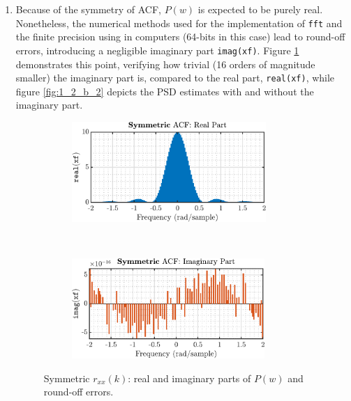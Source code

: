 \begin{enumerate}[label=\alph*), leftmargin=*]
\item
%

Because of the symmetry of ACF, $P(w)$ is expected to be purely real. Nonetheless, the numerical methods used for the implementation
of \texttt{fft} and the finite precision using in computers (64-bits in this case) lead to round-off errors, introducing a negligible
imaginary part \texttt{imag(xf)}. Figure \ref{fig:1_2_b_1} demonstrates this point, verifying how trivial (16 orders of magnitude smaller)
the imaginary part is, compared to the real part, \texttt{real(xf)}, while figure \ref{fig:1_2_b_2} depicts the PSD estimates with and
without the imaginary part.

\begin{figure}[h]
    \centering
    \begin{subfigure}{0.49\textwidth}
        \centering
        \includegraphics[height=1.5in]{report/spectrum-estimation/properties-of-power-spectral-density/assets/b/symmetric_real-M_10}
    \end{subfigure}
    ~ 
    \begin{subfigure}{0.49\textwidth}
        \centering
        \includegraphics[height=1.5in]{report/spectrum-estimation/properties-of-power-spectral-density/assets/b/symmetric_imag-M_10}
    \end{subfigure}
    \caption{Symmetric $r_{xx}(k)$: real and imaginary parts of $P(w)$ and round-off errors.}
    \label{fig:1_2_b_1}
\end{figure}


\end{enumerate}
